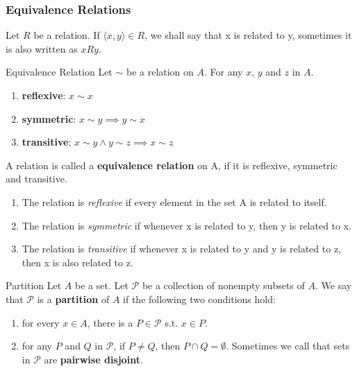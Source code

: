 \subsubsection{Equivalence Relations}
Let $R$ be a relation. If $\langle x,y \rangle \in R$, we shall say
that x is related to y, sometimes it is also written as $xRy$.

\begin{definition}{Equivalence Relation}{}
    Let $\sim$ be a relation on $A$. For any $x$, $y$ and $z$ in $A$.
    \begin{enumerate}

        \item \textbf{reflexive}: $x \sim x$
        \item \textbf{symmetric}: $x \sim y \implies y \sim x$
        \item \textbf{transitive}: $x \sim y \land y \sim z \implies x \sim z$

    \end{enumerate}
    A relation is called a \textbf{equivalence relation} on A, if it is
    reflexive, symmetric and transitive.
\end{definition}

\begin{remarks}
    \begin{enumerate}

        \item The relation is \textit{reflexive} if every element in the
            set A is related to itself.
        \item The relation is \textit{symmetric} if whenever x is related
            to y, then y is related to x.
        \item The relation is \textit{transitive} if whenever x is
            related to y and y is related to z, then x is also related to z.

    \end{enumerate}
\end{remarks}

\begin{definition}{Partition}{}
    Let $A$ be a set. Let $\mathcal{P}$ be a collection of nonempty
    subsets of $A$. We say that $\mathcal{P}$ is a \textbf{partition}
    of $A$ if the following two conditions hold:
    \begin{enumerate}

        \item for every $x \in A$, there is a $P \in \mathcal{P}$
            s.t. $x \in P$.
        \item for any $P$ and $Q$ in $\mathcal{P}$, if $P \neq Q$, then
            $P \cap Q = \emptyset$. Sometimes we call that sets in
            $\mathcal{P}$ are \textbf{pairwise disjoint}.

    \end{enumerate}
\end{definition}

